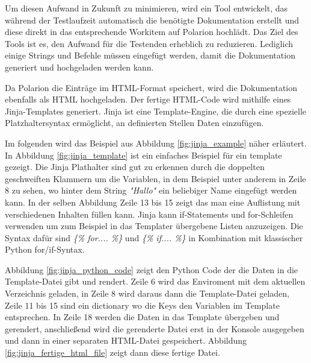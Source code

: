 \documentclass[a4paper, 12pt]{article}
\begin{document}
Um diesen Aufwand in Zukunft zu minimieren, wird ein Tool entwickelt, das während der Testlaufzeit automatisch die benötigte Dokumentation erstellt und diese direkt in das entsprechende Workitem auf Polarion hochlädt. Das Ziel des Tools ist es, den Aufwand für die Testenden erheblich zu reduzieren. Lediglich einige Strings und Befehle müssen eingefügt werden, damit die Dokumentation generiert und hochgeladen werden kann.

Da Polarion die Einträge im HTML-Format speichert, wird die Dokumentation ebenfalls als HTML hochgeladen. Der fertige HTML-Code wird mithilfe eines Jinja-Templates generiert. Jinja ist eine Template-Engine, die durch eine spezielle Platzhaltersyntax ermöglicht, an definierten Stellen Daten einzufügen.

Im folgenden wird das Beispiel aus Abbildung \ref{fig:jinja_example} näher erläutert. In Abbildung \ref{fig:jinja_template} ist ein einfaches Beispiel für ein template gezeigt. Die Jinja Plathalter sind gut zu erkennen durch die doppelten geschweiften Klammern um die Variablen, in dem Beispiel unter anderem in Zeile 8 zu sehen, wo hinter dem String \textit{"Hallo"} ein beliebiger Name eingefügt werden kann. In der selben Abbildung Zeile 13 bis 15 zeigt das man eine Auflistung mit verschiedenen Inhalten füllen kann. Jinja kann if-Statements und for-Schleifen verwenden um zum Beispiel in das Templater übergebene Listen anzuzeigen. Die Syntax dafür sind  \textit{\{\% for.... \%\}}  und \textit{\{\% if.... \%\}} in Kombination mit klassischer Python for/if-Syntax. 

Abbildung \ref{fig:jinja_python_code} zeigt den Python Code der die Daten in die Template-Datei gibt und rendert. Zeile 6 wird das Enviroment mit dem aktuellen Verzeichnis geladen, in Zeile 8 wird daraus dann die Template-Datei geladen, Zeile 11 bis 15 sind ein dictionary wo die Keys den Variablen im Template entsprechen. In Zeile 18 werden die Daten in das Template übergeben und gerendert, anschließend wird die gerenderte Datei erst in der Konsole ausgegeben und dann in einer separaten HTML-Datei gespeichert.
Abbildung \ref{fig:jinja_fertige_html_file} zeigt dann diese fertige Datei. \cite{jinja_doku} 
\end{document}
